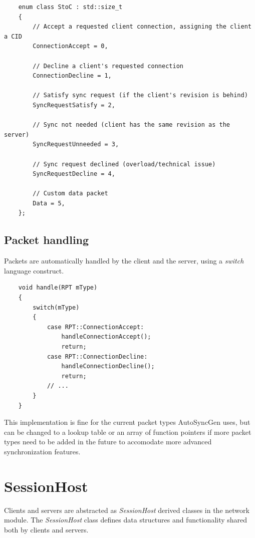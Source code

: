 \documentclass{report}
\def \cppStart {\begin{verbatim}}
\begin{document}
                    \cppStart
    enum class StoC : std::size_t
    {
        // Accept a requested client connection, assigning the client a CID
        ConnectionAccept = 0,       
        
        // Decline a client's requested connection
        ConnectionDecline = 1,      

        // Satisfy sync request (if the client's revision is behind)
        SyncRequestSatisfy = 2,     

        // Sync not needed (client has the same revision as the server)
        SyncRequestUnneeded = 3,    

        // Sync request declined (overload/technical issue)
        SyncRequestDecline = 4,     

        // Custom data packet
        Data = 5,                   
    };
                    \end{verbatim}
            
            \subsection{Packet handling}
                Packets are automatically handled by the client and the server, using a \emph{switch} language construct.

                \cppStart
    void handle(RPT mType)
    {
        switch(mType)
        {
            case RPT::ConnectionAccept:
                handleConnectionAccept();
                return;
            case RPT::ConnectionDecline:
                handleConnectionDecline();
                return;
            // ...
        }
    }
                \end{verbatim}

                This implementation is fine for the current packet types AutoSyncGen uses, but can be changed to a lookup table or an array of function pointers if more packet types need to be added in the future to accomodate more advanced synchronization features.

        \section{SessionHost}

            Clients and servers are abstracted as \emph{SessionHost} derived classes in the network module.
            The \emph{SessionHost} class defines data structures and functionality shared both by clients and servers.
\end{document}
